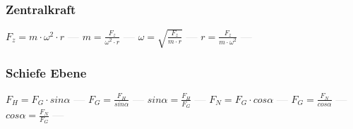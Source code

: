 \subsubsection{Zentralkraft} 
\begin{minipage}{0.45\textwidth} 
\end{minipage} 
\begin{minipage}{0.45\textwidth} 
 
\end{minipage} 
$ F_{z}  = m\cdot \omega ^{2} \cdot r $ \textcolor{lightgray}{\textbf{---}} 
$ m = \frac{ F_{z} }{\omega ^{2} \cdot r} $ \textcolor{lightgray}{\textbf{---}} 
$ \omega  = \sqrt{\frac{ F_{z} }{m\cdot r}} $ \textcolor{lightgray}{\textbf{---}} 
$ r = \frac{ F_{z} }{m\cdot \omega ^{2} } $ \textcolor{lightgray}{\textbf{---}} 

\subsubsection{Schiefe Ebene} 
\begin{minipage}{0.45\textwidth} 
\end{minipage} 
\begin{minipage}{0.45\textwidth} 
 
\end{minipage} 
$ F_{H}  = F_{G} \cdot sin \alpha $ \textcolor{lightgray}{\textbf{---}} 
$ F_{G}  = \frac{ F_{H} }{sin \alpha } $ \textcolor{lightgray}{\textbf{---}} 
$ sin \alpha  = \frac{F_{H} }{F_{G} } $ \textcolor{lightgray}{\textbf{---}} 
$ F_{N}  = F_{G} \cdot cos \alpha $ \textcolor{lightgray}{\textbf{---}} 
$ F_{G}  = \frac{ F_{N} }{cos \alpha } $ \textcolor{lightgray}{\textbf{---}} 
$ cos \alpha  = \frac{F_{N} }{F_{G} } $ \textcolor{lightgray}{\textbf{---}} 

